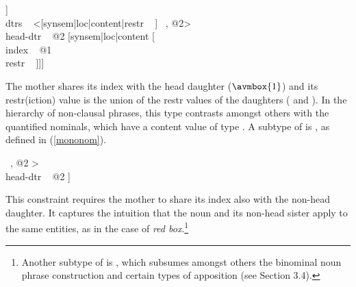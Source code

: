 \documentclass[output=paper]{langsci/langscibook}
\begin{document}
\begin{exe}
\ex\label{param} 
\begin{avm}
[\type{nominal-parameter}                                             \\
 synsem|loc [cat|head ~ \type{noun}                                   \\
             content [\type{parameter}                                \\
                      index ~ @1 \type{index}                         \\
                      restr ~ \avmbox{$\Sigma_{1}$} ~ $\bigcup$ ~ \avmbox{$\Sigma_{2}$}]] \\
 dtrs ~ <[synsem|loc|content|restr ~  ] ~, @2>     \\
 head-dtr ~ @2 [synsem|loc|content [                  \\
                                    index ~ @1                         \\
                                    restr ~  ]]]
\end{avm}
\end{exe}

\noindent
The mother shares its index with the head daughter ($\avmbox{1}$) and 
its {\sc restr(iction)} value is the union of the {\sc restr} values 
of the daughters ( and ). 
In the hierarchy of non-clausal phrases, this type contrasts amongst others with 
the quantified nominals, which have a {\sc content} value of type 
 \citep[203--205]{GS00}. A subtype of  is  
, as defined in (\ref{mononom}).  

\begin{exe}
\ex\label{mononom} 
\begin{avm}
[\type{intersective-modification}                \\
 synsem|loc|content|index ~ @1 \type{index}      \\
 dtrs ~ <[synsem|loc|content|index ~ @1 ] ~, @2 > \\
 head-dtr ~ @2  ]
\end{avm}
\end{exe}

\noindent 
This constraint requires the mother to share its index also with the 
non-head daughter. It captures the intuition that the 
noun and its non-head sister apply to the same entities, as in 
the case of \emph{red box}.\footnote{Another subtype of  
is , which subsumes amongst others 
the binominal noun phrase construction and certain types of apposition
(see Section 3.4).}  
\end{document}
